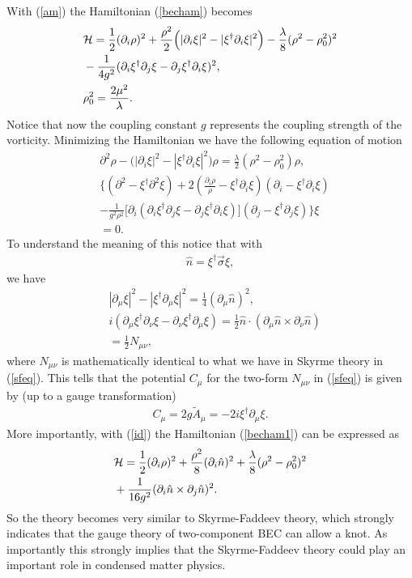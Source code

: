 \documentclass[twocolumn,showpacs,showkeys]{revtex4}
\newcommand{\bea}{\begin{eqnarray}}
\newcommand{\eea}{\end{eqnarray}}
\newcommand{\pro}{\partial}
\newcommand{\n}{\hat n}
\newcommand{\dfrac}{\displaystyle\frac}
\newcommand{\nn}{\nonumber}
\newcommand{\hn}{\hat n}
\begin{document}
With (\ref{am}) the Hamiltonian (\ref{becham}) becomes
\bea
&{\cal H} = \dfrac {1}{2} (\pro_i \rho)^2 + \dfrac {\rho^2}{2}\Big(|\pro_i
\xi |^2 - |\xi^\dag \pro_i \xi|^2 \Big) 
- \dfrac {\lambda}{8} (\rho^2 - \rho^2_0)^2 \nn\\
&- \dfrac {1}{4 g^2} (\pro_i \xi^\dag \pro_j \xi 
- \pro_j \xi^\dag \pro_i \xi)^2, \nn\\
&\rho^2_0= \dfrac{2\mu^2}{\lambda}.
\label{becham1}
\eea
Notice that now the coupling constant $g$ represents
the coupling strength of the vorticity.
Minimizing the Hamiltonian we have
the following equation of motion
\bea
& \pro^2 \rho - \Big(|\pro_i \xi |^2 - |\xi^\dag \pro_i \xi|^2 \Big)
\rho = \dfrac {\lambda}{2} (\rho^2 - \rho_0^2) \rho,\nn \\
&\Big\{(\pro^2 - \xi^\dag \pro^2 \xi) + 2 (\dfrac {\pro_i
\rho}{\rho} - \xi^\dag \pro_i\xi)(\pro_i - \xi^\dag \pro_i \xi) \nn\\
&- \dfrac {1}{g^2 \rho^2} \Big[\pro_i (\pro_i
\xi^\dag \pro_j \xi - \pro_j \xi^\dag \pro_i \xi) \Big] 
(\pro_j - \xi^\dag \pro_j \xi) \Big\} \xi \nn\\
&= 0.
\label{beckeq1}
\eea
To understand the meaning of this notice that with
\bea
\n = \xi^\dag \vec \sigma \xi,
\label{hn}
\eea
we have
\bea
& |\pro_\mu \xi|^2 - |\xi^\dag \pro_\mu \xi|^2
= \dfrac{1}{4} (\pro_\mu \hn)^2, \nn\\
&i (\pro_\mu \xi^\dag \pro_\nu \xi 
- \pro_\nu \xi^\dag \pro_\mu \xi ) 
= \dfrac{1}{2} \hn \cdot (\pro_\mu \hn \times \pro_\nu \hn) \nn\\
&= \dfrac{1}{2} N_{\mu\nu},
\label{id}
\eea
where $N_{\mu\nu}$ is mathematically identical to what we have 
in Skyrme theory in (\ref{sfeq}).
This tells that the potential $C_\mu$ for the two-form $N_{\mu\nu}$
in (\ref{sfeq}) is given by (up to a gauge transformation)
\bea
C_\mu = 2g \tilde A_\mu = -2i \xi^\dag \pro_\mu \xi. 
\label{cm}
\eea
More importantly, with (\ref{id}) the Hamiltonian (\ref{becham1}) 
can be expressed as
\bea
&{\cal H} = \dfrac{1}{2} (\pro_i \rho)^2
+ \dfrac{\rho^2}{8} (\pro_i \hn)^2 
+ \dfrac{\lambda}{8}(\rho^2-\rho^2_0)^2 \nn\\
&+ \dfrac{1}{16 g^2} (\pro_i \hn \times \pro_j \hn)^2.
\eea
So the theory becomes very similar to Skyrme-Faddeev
theory, which strongly indicates that 
the gauge theory of two-component BEC can allow a knot.
As importantly this strongly implies that the Skyrme-Faddeev theory 
could play an important role in condensed matter
physics.
\end{document}
